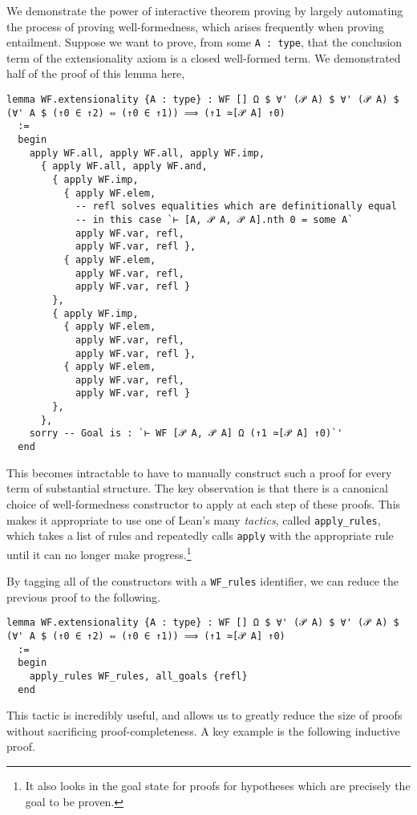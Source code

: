 \documentclass[12pt,leqno]{article}
\def\lc{\lstinline}
\theoremstyle{example}
\numberwithin{equation}{section}
\begin{document}
We demonstrate the power of interactive theorem proving by largely automating the process of proving well-formedness, which arises frequently when proving entailment. Suppose we want to prove, from some \lc{A : type}, that the conclusion term of the extensionality axiom is a closed well-formed term. We demonstrated half of the proof of this lemma here,
\begin{lstlisting}
lemma WF.extensionality {A : type} : WF [] Ω $ ∀' (𝒫 A) $ ∀' (𝒫 A) $ (∀' A $ (↑0 ∈ ↑2) ⇔ (↑0 ∈ ↑1)) ⟹ (↑1 ≃[𝒫 A] ↑0)
  :=
  begin
    apply WF.all, apply WF.all, apply WF.imp,
      { apply WF.all, apply WF.and,
        { apply WF.imp,
          { apply WF.elem,
            -- refl solves equalities which are definitionally equal
            -- in this case `⊢ [A, 𝒫 A, 𝒫 A].nth 0 = some A`
            apply WF.var, refl,
            apply WF.var, refl },
          { apply WF.elem,
            apply WF.var, refl,
            apply WF.var, refl }
        },
        { apply WF.imp,
          { apply WF.elem,
            apply WF.var, refl,
            apply WF.var, refl },
          { apply WF.elem,
            apply WF.var, refl,
            apply WF.var, refl }
        },
      },
    sorry -- Goal is : `⊢ WF [𝒫 A, 𝒫 A] Ω (↑1 ≃[𝒫 A] ↑0)`'
  end
\end{lstlisting}

This becomes intractable to have to manually construct such a proof for every term of substantial structure. The key observation is that there is a canonical choice of well-formedness constructor to apply at each step of these proofs. This makes it appropriate to use one of Lean's many \emph{tactics}, called \lc{apply_rules}, which takes a list of rules and repeatedly calls \lc{apply} with the appropriate rule until it can no longer make progress.\footnote{It also looks in the goal state for proofs for hypotheses which are precisely the goal to be proven.}

By tagging all of the constructors with a \lc{WF_rules} identifier, we can reduce the previous proof to the following.

\begin{lstlisting}
lemma WF.extensionality {A : type} : WF [] Ω $ ∀' (𝒫 A) $ ∀' (𝒫 A) $ (∀' A $ (↑0 ∈ ↑2) ⇔ (↑0 ∈ ↑1)) ⟹ (↑1 ≃[𝒫 A] ↑0)
  :=
  begin
    apply_rules WF_rules, all_goals {refl}
  end
\end{lstlisting}

This tactic is incredibly useful, and allows us to greatly reduce the size of proofs without sacrificing proof-completeness. A key example is the following inductive proof.
\end{document}
